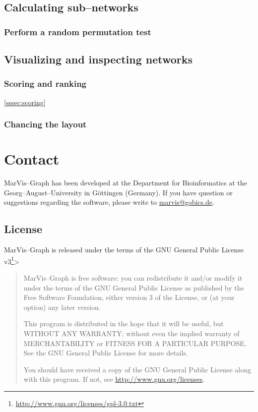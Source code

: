 \documentclass[titlepage,a4paper,twoside]{article}
\newcommand{\mg}{MarVis--Graph\xspace}
\begin{document}
\subsection{Calculating sub--networks}\label{ssec:calculate}

\subsubsection{Perform a random permutation test}

\subsection{Visualizing and inspecting networks}

\subsubsection{Scoring and ranking} \ref{sssec:scoring}

\subsubsection{Chancing the layout}

\section{Contact}
\mg has been developed at the Department for Bioinformatics at the
Georg--August--University in G\"ottingen (Germany).
If you have question or suggestions regarding the software, please write to
\href{mailto:marvis@gobics.de}{marvis@gobics.de}.

\subsection{License}
\mg is released under the terms of the GNU General Public License
v3\footnote{\url{http://www.gnu.org/licenses/gpl-3.0.txt}}> 

\begin{quote}\mg is free software: you can redistribute it and/or modify
    it under the terms of the GNU General Public License as published by
    the Free Software Foundation, either version 3 of the License, or
    (at your option) any later version.

    This program is distributed in the hope that it will be useful,
    but WITHOUT ANY WARRANTY; without even the implied warranty of
    MERCHANTABILITY or FITNESS FOR A PARTICULAR PURPOSE.  See the
    GNU General Public License for more details.

    You should have received a copy of the GNU General Public License
	along with this program.  If not, see \url{http://www.gnu.org/licenses}.
\end{quote}
\end{document}
